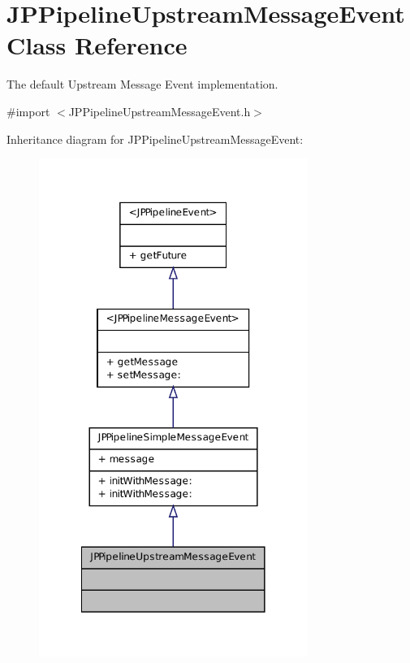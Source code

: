 \hypertarget{a00036}{
\section{JPPipelineUpstreamMessageEvent Class Reference}
\label{a00036}
}


The default Upstream Message Event implementation.  




{\ttfamily \#import $<$JPPipelineUpstreamMessageEvent.h$>$}



Inheritance diagram for JPPipelineUpstreamMessageEvent:\nopagebreak
\begin{figure}[H]
\begin{center}
\leavevmode
\includegraphics[width=248pt]{a00155}
\end{center}
\end{figure}


